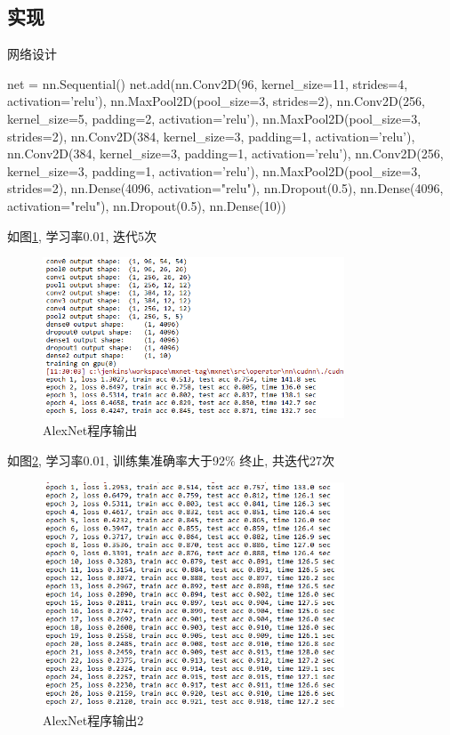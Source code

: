 \documentclass[a4paper]{article}
\theoremstyle{definition}
\numberwithin{equation}{section}
\begin{document}
\subsection{实现}

网络设计
\begin{python}
 
net = nn.Sequential()
net.add(nn.Conv2D(96,  kernel_size=11,  strides=4,  activation='relu'), 
        nn.MaxPool2D(pool_size=3,  strides=2), 
        nn.Conv2D(256,  kernel_size=5,  padding=2,  activation='relu'), 
        nn.MaxPool2D(pool_size=3,  strides=2), 
        nn.Conv2D(384,  kernel_size=3,  padding=1,  activation='relu'), 
        nn.Conv2D(384,  kernel_size=3,  padding=1,  activation='relu'), 
        nn.Conv2D(256,  kernel_size=3,  padding=1,  activation='relu'), 
        nn.MaxPool2D(pool_size=3,  strides=2), 
        nn.Dense(4096,  activation="relu"),  nn.Dropout(0.5), 
        nn.Dense(4096,  activation="relu"),  nn.Dropout(0.5), 
        nn.Dense(10))
\end{python}


如图\ref{AlexOutput1}, 学习率0.01, 迭代5次
\begin{figure}[!htb]
    \center
\includegraphics[width=0.8\textwidth]{alex_output.png}
\caption{AlexNet程序输出}
\label{AlexOutput1}

\end{figure}
 

如图\ref{AlexOutput2}, 学习率0.01, 训练集准确率大于92\% 终止, 共迭代27次
\begin{figure}[!ht]
    \center
\includegraphics[width=0.8\textwidth]{alex_output3.png}
\caption{AlexNet程序输出2}
\label{AlexOutput2}

\end{figure}
\end{document}
